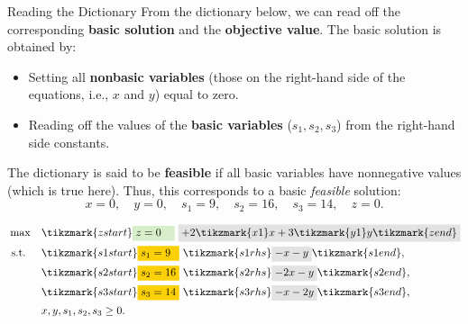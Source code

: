 \begin{remark}{Reading the Dictionary}{}
From the dictionary below, we can read off the corresponding \textbf{basic solution} and the \textbf{objective value}. The basic solution is obtained by:
\begin{itemize}
    \item Setting all \textbf{nonbasic variables} (those on the right-hand side of the equations, i.e., \(x\) and \(y\)) equal to zero.
    \item Reading off the values of the \textbf{basic variables} (\(s_1, s_2, s_3\)) from the right-hand side constants.
\end{itemize}

The dictionary is said to be \textbf{feasible} if all basic variables have nonnegative values (which is true here). Thus, this corresponds to a basic \emph{feasible} solution:
\[
x = 0, \quad y = 0, \quad s_1 = 9, \quad s_2 = 16, \quad s_3 = 14, \quad z = 0.
\]
\vspace{1cm}

\[
\begin{aligned}
\max \quad 
& \tikzmark{zstart} \text{\colorbox{green!20!white}{$z = 0$\phantom{$1_1$}}} ~ \text{\colorbox{gray!20!white}{$+ 2\tikzmark{x1}x + 3\tikzmark{y1}y \tikzmark{zend}$}} \\
\st \quad 
& \tikzmark{s1start} \text{\colorbox{yellow}{$s_1 = 9$\phantom{1}}} ~ \tikzmark{s1rhs}\text{\colorbox{gray!20!white}{$- x - y$}} \tikzmark{s1end}, \\
& \tikzmark{s2start} \text{\colorbox{yellow}{$s_2 = 16$}} ~ \tikzmark{s2rhs} \text{\colorbox{gray!20!white}{$- 2x - y$}} \tikzmark{s2end}, \\
& \tikzmark{s3start} \text{\colorbox{yellow}{$s_3 = 14$}} ~ \tikzmark{s3rhs} \text{\colorbox{gray!20!white}{$- x - 2y$}} \tikzmark{s3end}, \\
& x, y, s_1, s_2, s_3 \ge 0.
\end{aligned}
\]

\end{remark}


